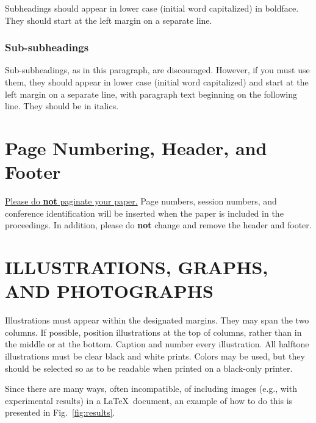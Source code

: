 \documentclass[a4paper,10pt,oneside]{article}
\begin{document}
\begin{sloppy}
Subheadings should appear in lower case (initial word capitalized) in boldface. They should start at the left margin on a separate line. 
 
\subsubsection{Sub-subheadings}
\label{sssec:subsubhead}

Sub-subheadings, as in this paragraph, are discouraged. However, if you must use them, they should appear in lower case (initial word capitalized) and start at the left margin on a separate line, with paragraph text beginning on the following line. They should be in italics.  \\

\section{Page Numbering, Header, and Footer}
\label{sec:page}

\underline{Please do {\bf not} paginate your paper.} Page numbers, session numbers, and conference identification will be inserted when the paper is included in the proceedings. In addition, please do {\bf not} change and remove the header and footer.

\section{ILLUSTRATIONS, GRAPHS, AND PHOTOGRAPHS}
\label{sec:illust}

Illustrations must appear within the designated margins. They may span the two columns. If possible, position illustrations at the top of columns, rather than in the middle or at the bottom. Caption and number every illustration. All halftone illustrations must be clear black and white prints. Colors may be used, but they should be selected so as to be readable when printed on a black-only printer.

Since there are many ways, often incompatible, of including images (e.g., with experimental results) in a \LaTeX ~document, an example of how to do this is presented in Fig.~\ref{fig:results}.


\end{sloppy}
\end{document}
